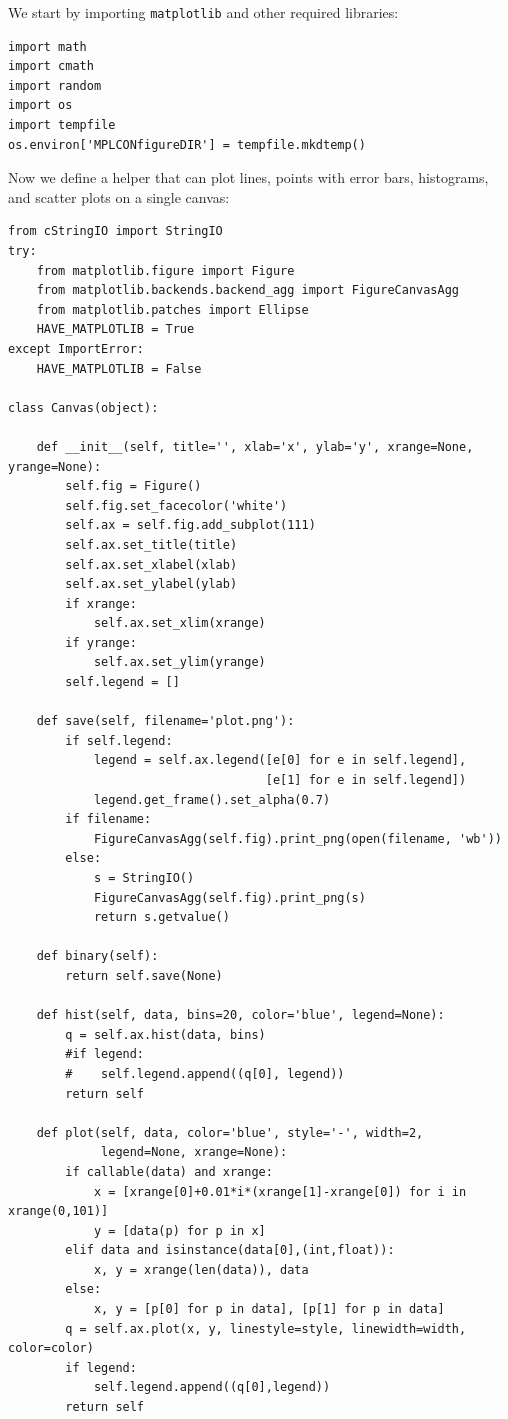 \documentclass[justified,sixbynine]{tufte-book}
\def\ft{\small\tt}
\theoremstyle{plain}%
\theoremstyle{definition}
\theoremstyle{remark}
\begin{document}
\begin{fullwidth}
We start by importing {\ft matplotlib} and other required libraries:

\begin{lstlisting}[caption={in file: {\ft nlib.py}}]
import math
import cmath
import random
import os
import tempfile
os.environ['MPLCONfigureDIR'] = tempfile.mkdtemp()
\end{lstlisting}

Now we define a helper that can plot lines, points with error bars, histograms, and scatter plots on a single canvas:


\begin{lstlisting}[caption={in file: {\ft nlib.py}}]
from cStringIO import StringIO
try:
    from matplotlib.figure import Figure
    from matplotlib.backends.backend_agg import FigureCanvasAgg
    from matplotlib.patches import Ellipse
    HAVE_MATPLOTLIB = True
except ImportError:
    HAVE_MATPLOTLIB = False

class Canvas(object):

    def __init__(self, title='', xlab='x', ylab='y', xrange=None, yrange=None):
        self.fig = Figure()
        self.fig.set_facecolor('white')
        self.ax = self.fig.add_subplot(111)
        self.ax.set_title(title)
        self.ax.set_xlabel(xlab)
        self.ax.set_ylabel(ylab)
        if xrange:
            self.ax.set_xlim(xrange)
        if yrange:
            self.ax.set_ylim(yrange)
        self.legend = []

    def save(self, filename='plot.png'):
        if self.legend:
            legend = self.ax.legend([e[0] for e in self.legend],
                                    [e[1] for e in self.legend])
            legend.get_frame().set_alpha(0.7)
        if filename:
            FigureCanvasAgg(self.fig).print_png(open(filename, 'wb'))
        else:
            s = StringIO()
            FigureCanvasAgg(self.fig).print_png(s)
            return s.getvalue()

    def binary(self):
        return self.save(None)

    def hist(self, data, bins=20, color='blue', legend=None):
        q = self.ax.hist(data, bins)
        #if legend:
        #    self.legend.append((q[0], legend))
        return self

    def plot(self, data, color='blue', style='-', width=2,
             legend=None, xrange=None):
        if callable(data) and xrange:
            x = [xrange[0]+0.01*i*(xrange[1]-xrange[0]) for i in xrange(0,101)]
            y = [data(p) for p in x]
        elif data and isinstance(data[0],(int,float)):
            x, y = xrange(len(data)), data
        else:
            x, y = [p[0] for p in data], [p[1] for p in data]
        q = self.ax.plot(x, y, linestyle=style, linewidth=width, color=color)
        if legend:
            self.legend.append((q[0],legend))
        return self


\end{lstlisting}
\end{fullwidth}
\end{document}
